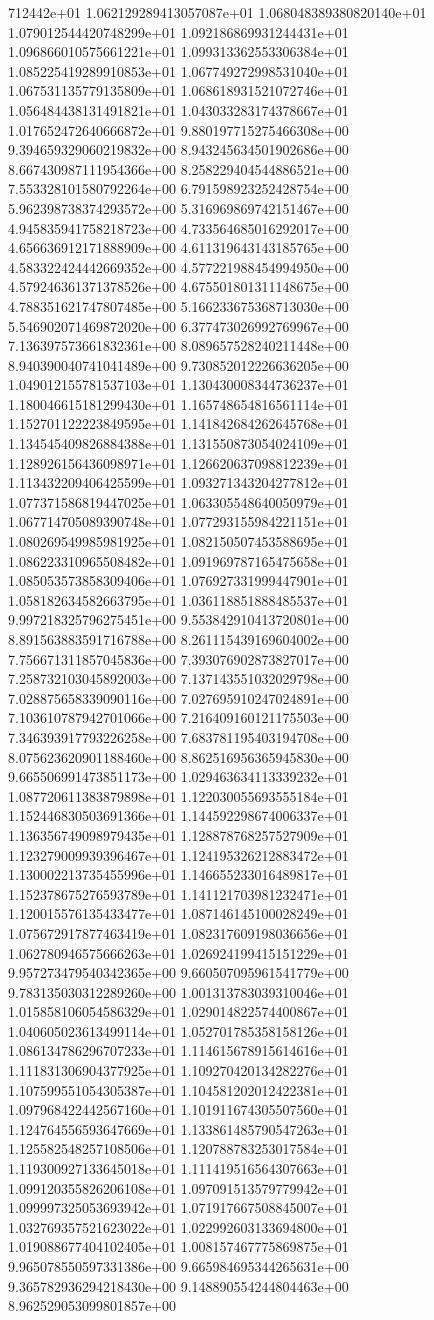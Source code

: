 712442e+01	1.062129289413057087e+01	1.068048389380820140e+01	1.079012544420748299e+01	1.092186869931244431e+01	1.096866010575661221e+01	1.099313362553306384e+01	1.085225419289910853e+01	1.067749272998531040e+01	1.067531135779135809e+01	1.068618931521072746e+01	1.056484438131491821e+01	1.043033283174378667e+01	1.017652472640666872e+01	9.880197715275466308e+00	9.394659329060219832e+00	8.943245634501902686e+00	8.667430987111954366e+00	8.258229404544886521e+00	7.553328101580792264e+00	6.791598923252428754e+00	5.962398738374293572e+00	5.316969869742151467e+00	4.945835941758218723e+00	4.733564685016292017e+00	4.656636912171888909e+00	4.611319643143185765e+00	4.583322424442669352e+00	4.577221988454994950e+00	4.579246361371378526e+00	4.675501801311148675e+00	4.788351621747807485e+00	5.166233675368713030e+00	5.546902071469872020e+00	6.377473026992769967e+00	7.136397573661832361e+00	8.089657528240211448e+00	8.940390040741041489e+00	9.730852012226636205e+00	1.049012155781537103e+01	1.130430008344736237e+01	1.180046615181299430e+01	1.165748654816561114e+01	1.152701122223849595e+01	1.141842684262645768e+01	1.134545409826884388e+01	1.131550873054024109e+01	1.128926156436098971e+01	1.126620637098812239e+01	1.113432209406425599e+01	1.093271343204277812e+01	1.077371586819447025e+01	1.063305548640050979e+01	1.067714705089390748e+01	1.077293155984221151e+01	1.080269549985981925e+01	1.082150507453588695e+01	1.086223310965508482e+01	1.091969787165475658e+01	1.085053573858309406e+01	1.076927331999447901e+01	1.058182634582663795e+01	1.036118851888485537e+01	9.997218325796275451e+00	9.553842910413720801e+00	8.891563883591716788e+00	8.261115439169604002e+00	7.756671311857045836e+00	7.393076902873827017e+00	7.258732103045892003e+00	7.137143551032029798e+00	7.028875658339090116e+00	7.027695910247024891e+00	7.103610787942701066e+00	7.216409160121175503e+00	7.346393917793226258e+00	7.683781195403194708e+00	8.075623620901188460e+00	8.862516956365945830e+00	9.665506991473851173e+00	1.029463634113339232e+01	1.087720611383879898e+01	1.122030055693555184e+01	1.152446830503691366e+01	1.144592298674006337e+01	1.136356749098979435e+01	1.128878768257527909e+01	1.123279009939396467e+01	1.124195326212883472e+01	1.130002213735455996e+01	1.146655233016489817e+01	1.152378675276593789e+01	1.141121703981232471e+01	1.120015576135433477e+01	1.087146145100028249e+01	1.075672917877463419e+01	1.082317609198036656e+01	1.062780946575666263e+01	1.026924199415151229e+01	9.957273479540342365e+00	9.660507095961541779e+00	9.783135030312289260e+00	1.001313783039310046e+01	1.015858106054586329e+01	1.029014822574400867e+01	1.040605023613499114e+01	1.052701785358158126e+01	1.086134786296707233e+01	1.114615678915614616e+01	1.111831306904377925e+01	1.109270420134282276e+01	1.107599551054305387e+01	1.104581202012422381e+01	1.097968422442567160e+01	1.101911674305507560e+01	1.124764556593647669e+01	1.133861485790547263e+01	1.125582548257108506e+01	1.120788783253017584e+01	1.119300927133645018e+01	1.111419516564307663e+01	1.099120355826206108e+01	1.097091513579779942e+01	1.099997325053693942e+01	1.071917667508845007e+01	1.032769357521623022e+01	1.022992603133694800e+01	1.019088677404102405e+01	1.008157467775869875e+01	9.965078550597331386e+00	9.665984695344265631e+00	9.365782936294218430e+00	9.148890554244804463e+00	8.962529053099801857e+00	